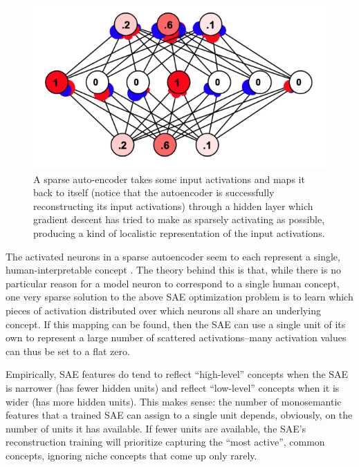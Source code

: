 \begin{figure}[ht]
\centering
\includegraphics[scale=.5]{./images/saeSimbrain.png}
\caption[Simbrain screenshot from Jeff Yoshimi.]{ A sparse auto-encoder takes
      some input activations and maps it back to itself (notice that the
      autoencoder is successfully reconstructing its input activations)
      through a hidden layer which gradient descent has tried to make
      as sparsely activating as possible, producing a kind of localistic representation of
      the input activations. }
\label{saeSimbrain}
\end{figure}

The activated neurons in a sparse autoencoder seem to each represent a single,
human-interpretable concept \cite{cunningham2023sparse,
bricken2023monosemanticity}. The theory behind this is that, while there is no
particular reason for a model neuron to correspond to a single human concept,
one very sparse solution to the above SAE optimization problem is to learn
which pieces of activation distributed over which neurons all share an
underlying concept. If this mapping can be found, then the SAE can use a single
unit of its own to represent a large number of scattered activations--many
activation values can thus be set to a flat zero.

Empirically, SAE features do tend to reflect ``high-level'' concepts when the
SAE is narrower (has fewer hidden units) and reflect ``low-level'' concepts
when it is wider (has more hidden units). This makes sense: the number of
monosemantic features that a trained SAE can assign to a single unit depends,
obviously, on the number of units it has available. If fewer units are
available, the SAE's reconstruction training will prioritize capturing the
``most active'', common concepts, ignoring niche concepts that come up only
rarely.

